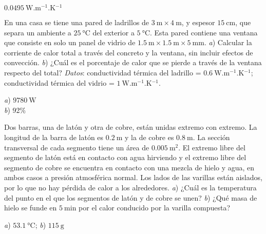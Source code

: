 \begin{Answer}
  $\SI{0.0495}{\watt.\metre^{-1}.\kelvin^{-1}}$
\end{Answer}
%
\begin{Exercise}\label{p:transmision00}
  {}{}
  En una casa se tiene una pared de ladrillos de $\SI{3}{\metre} \times \SI{4}{\metre}$, y espesor $\SI{15}{\centi\metre}$, que separa un ambiente a $\SI{25}{\celsius}$ del exterior a $\SI{5}{\celsius}$. Esta pared contiene una ventana que consiste en solo un panel de vidrio de $\SI{1.5}{\metre} \times \SI{1.5}{\metre} \times \SI{5}{\milli\metre}$. \textit{a}) Calcular la corriente de calor total a través del concreto y la ventana, sin incluir efectos de convección. \textit{b}) ¿Cuál es el porcentaje de calor que se pierde a través de la ventana respecto del total? \textit{Datos}: conductividad térmica del ladrillo = $\SI{0.6}{\watt.\metre^{-1}.\kelvin^{-1}}$; conductividad térmica del vidrio = $\SI{1}{\watt.\metre^{-1}.\kelvin^{-1}}$.
\end{Exercise}
\begin{Answer}
	\begin{minipage}[t]{.4\textwidth}
    \textit{a}) $\SI{9780}{\watt}$\\ \textit{b}) 92\%
  \end{minipage}
\end{Answer}
%
\begin{Exercise}
  {}{}
  Dos barras, una de latón y otra de cobre, están unidas extremo con extremo. La longitud de la barra de latón es $\SI{0.2}{\metre}$ y la de cobre es $\SI{0.8}{\metre}$. La sección transversal de cada segmento tiene un área de $\SI{0.005}{\square\metre}$. El extremo libre del segmento de latón está en contacto con agua hirviendo y el extremo libre del segmento de cobre se encuentra en contacto con una mezcla de hielo y agua, en ambos casos a presión atmosférica normal. Los lados de las varillas están aislados, por lo que no hay pérdida de calor a los alrededores. \textit{a}) ¿Cuál es la temperatura del punto en el que los segmentos de latón y de cobre se unen? \textit{b}) ¿Qué masa de hielo se funde en $\SI{5}{\minute}$ por el calor conducido por la varilla compuesta?
\end{Exercise}
\begin{Answer}
	\begin{minipage}[t]{.4\textwidth}
    \textit{a}) $\SI{53.1}{\celsius}$; \textit{b}) $\SI{115}{\gram}$
  \end{minipage}
\end{Answer}
